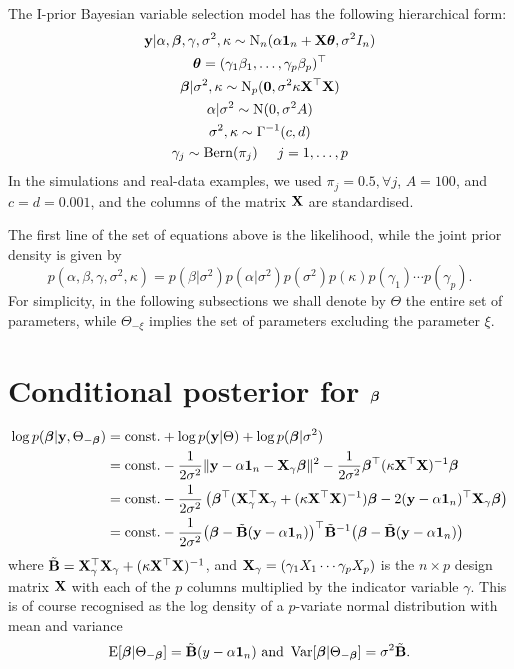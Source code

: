 The I-prior Bayesian variable selection model has the following hierarchical form:
\begin{align*}
  \begin{gathered}
    {\mathbf y}|\alpha,{\bm\beta},\gamma,\sigma^2,\kappa \sim \operatorname{N}_n(\alpha{\mathbf 1}_n + {\mathbf X}{\bm\theta}, \sigma^2 I_n) \\
    {\bm\theta} = (\gamma_1\beta_1,\dots,\gamma_p\beta_p)^\top \\
    {\bm\beta}|\sigma^2,\kappa \sim \operatorname{N}_p({\mathbf 0},\sigma^2\kappa \mathbf X^\top \mathbf X) \\
    \alpha|\sigma^2 \sim \operatorname{N}(0,\sigma^2 A) \\
    \sigma^2,\kappa \sim \Gamma^{-1}(c,d) \\
    \gamma_j \sim \operatorname{Bern}(\pi_j) \hspace{0.5cm} j=1,\dots,p
  \end{gathered}
\end{align*}
In the simulations and real-data examples, we used $\pi_j=0.5, \forall j$, $A=100$, and $c=d=0.001$, and the columns of the matrix ${\mathbf X}$ are standardised.

The first line of the set of equations above is the likelihood, while the joint prior density is given by
\[
  p(\alpha,\beta,\gamma,\sigma^2,\kappa) = p(\beta|\sigma^2)p(\alpha|\sigma^2)p(\sigma^2)p(\kappa)p(\gamma_1)\cdots p(\gamma_p).
\]    
For simplicity, in the following subsections we shall denote by $\Theta$ the entire set of parameters, while $\Theta_{-\xi}$ implies the set of parameters excluding the parameter $\xi$.

\section{Conditional posterior for \texorpdfstring{${\bm\beta}$}{$beta$}}

\begin{align*}
  \log p({\bm\beta}|{\mathbf y},\Theta_{-{\bm\beta}}) 
  &= \text{const.}\hspace{0.01em} + \log p({\mathbf y}|\Theta) + \log p({\bm\beta}|\sigma^2) \\
  &= \text{const.}\hspace{0.01em} - \frac{1}{2\sigma^2} \Vert {\mathbf y} - \alpha {\mathbf 1}_n - {\mathbf X}_\gamma{\bm\beta} \Vert^2  
  - \frac{1}{2\sigma^2}{\bm\beta}^\top (\kappa \mathbf X^\top \mathbf X)^{-1} {\bm\beta} \\
  &= \text{const.}\hspace{0.01em} - \frac{1}{2\sigma^2} \left( {\bm\beta}^\top ({\mathbf X}_\gamma^\top {\mathbf X}_\gamma + (\kappa \mathbf X^\top \mathbf X)^{-1}) {\bm\beta} - 2({\mathbf y} - \alpha {\mathbf 1}_n)^\top {\mathbf X}_\gamma{\bm\beta} \right) \\
  &= \text{const.}\hspace{0.01em} - \frac{1}{2\sigma^2} \big({\bm\beta} - \tilde {{\mathbf B}}({\mathbf y} - \alpha {\mathbf 1}_n)\big)^\top \tilde {{\mathbf B}}^{-1} \big({\bm\beta} - \tilde {{\mathbf B}}({\mathbf y} - \alpha {\mathbf 1}_n)\big) 
\end{align*}
where $\tilde {{\mathbf B}} = {\mathbf X}_\gamma^\top {\mathbf X}_\gamma + (\kappa \mathbf X^\top \mathbf X)^{-1}$, and ${\mathbf X}_\gamma = (\gamma_1X_1 \cdots \gamma_pX_p)$ is the $n \times p$ design matrix ${\mathbf X}$ with each of the $p$ columns multiplied by the indicator variable $\gamma$.
This is of course recognised as the log density of a $p$-variate normal distribution with mean and variance
\[
  \operatorname{E}[{\bm\beta}|\Theta_{-{\bm\beta}}] = \tilde {{\mathbf B}}(y - \alpha {\mathbf 1}_n) \text{ and } \operatorname{Var}[{\bm\beta}|\Theta_{-{\bm\beta}}] = \sigma^2\tilde {{\mathbf B}}.
 \]

